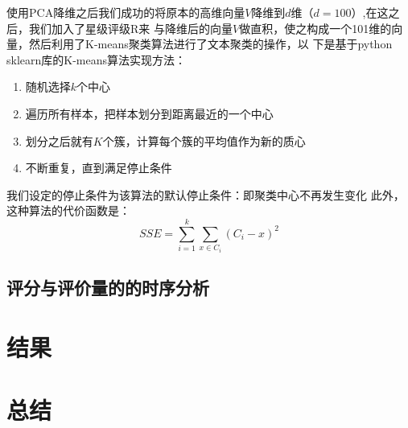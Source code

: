 使用PCA降维之后我们成功的将原本的高维向量$V$降维到$d$维（$d=100$）,在这之后，我们加入了星级评级R来
与降维后的向量$V$做直积，使之构成一个101维的向量，然后利用了K-means聚类算法进行了文本聚类的操作，以
下是基于python sklearn库的K-means算法实现方法：
\begin{enumerate}
    \item 随机选择$k$个中心
    \item 遍历所有样本，把样本划分到距离最近的一个中心
    \item 划分之后就有$K$个簇，计算每个簇的平均值作为新的质心
    \item 不断重复，直到满足停止条件
\end{enumerate}
我们设定的停止条件为该算法的默认停止条件：即聚类中心不再发生变化
此外，这种算法的代价函数是：
\begin{equation}
    S S E=\sum_{i=1}^{k} \sum_{x \in C_{i}}\left(C_{i}-x\right)^{2}
\end{equation}
\section{评分与评价量的的时序分析}

\chapter{结果}

\chapter{总结}

